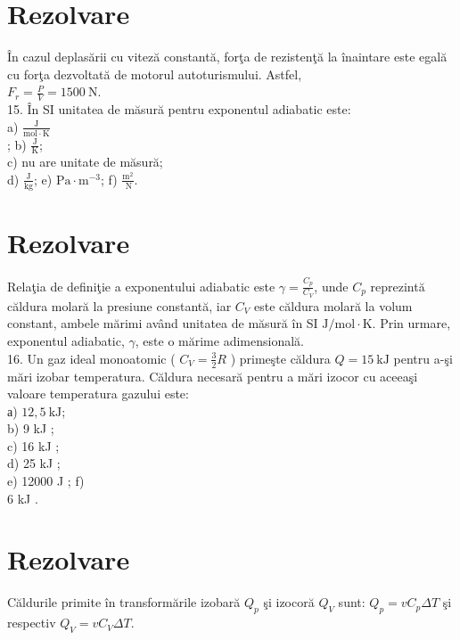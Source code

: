 \section*{Rezolvare}
În cazul deplasării cu viteză constantă, forţa de rezistenţă la înaintare este egală cu forţa dezvoltată de motorul autoturismului. Astfel,\\
$F_{r}=\frac{P}{V}=1500 \mathrm{~N}$.\\
15. În SI unitatea de măsură pentru exponentul adiabatic este:\\
a) $\frac{\mathrm{J}}{\mathrm{mol} \cdot \mathrm{K}}$\\
; b) $\frac{\mathrm{J}}{\mathrm{K}}$;\\
c) nu are unitate de măsură;\\
d) $\frac{\mathrm{J}}{\mathrm{kg}}$; e) $\mathrm{Pa} \cdot \mathrm{m}^{-3}$; f) $\frac{\mathrm{m}^{2}}{\mathrm{~N}}$.

\section*{Rezolvare}
Relaţia de definiţie a exponentului adiabatic este $\gamma=\frac{C_{p}}{C_{V}}$, unde $C_{p}$ reprezintă căldura molară la presiune constantă, iar $C_{V}$ este căldura molară la volum constant, ambele mărimi având unitatea de măsură în SI $\mathrm{J} / \mathrm{mol} \cdot \mathrm{K}$. Prin urmare, exponentul adiabatic, $\gamma$, este o mărime adimensională.\\
16. Un gaz ideal monoatomic ( $C_{V}=\frac{3}{2} R$ ) primeşte căldura $Q=15 \mathrm{~kJ}$ pentru a-şi mări izobar temperatura. Căldura necesară pentru a mări izocor cu aceeaşi valoare temperatura gazului este:\\
а) $12,5 \mathrm{~kJ}$;\\
b) 9 kJ ;\\
c) 16 kJ ;\\
d) 25 kJ ;\\
e) 12000 J ; f)\\
6 kJ .

\section*{Rezolvare}
Căldurile primite în transformările izobară $Q_{p}$ şi izocoră $Q_{V}$ sunt: $Q_{p}=v C_{p} \Delta T$ şi respectiv $Q_{V}=v C_{V} \Delta T$.

